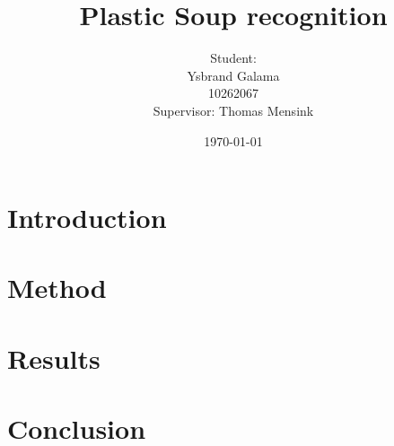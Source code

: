 \documentclass{beamer}
\title[Plastic Soup recognition]{Plastic Soup recognition}
\subtitle[]{}
\author[Y. Galama]{Student:\\Ysbrand Galama \\ 10262067 \\[2pc] Supervisor: Thomas Mensink\\}
\institute[UvA]
{
 \texttt{[image: images/uva-campus.pdf]}
}
\date{\today}
\begin{document}
	\begin{frame}
	  \titlepage
	\end{frame}

\section{Introduction}

\section{Method}

\section{Results}

\section{Conclusion}


\end{document}
